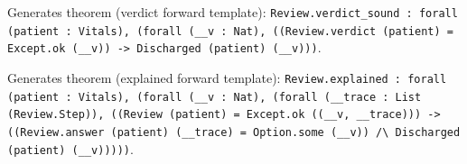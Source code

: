 \documentclass[11pt]{article}
\begin{document}
\noindent Generates theorem (verdict forward template): \texttt{Review.verdict\_sound : forall (patient : Vitals), (forall (\_\_v : Nat), ((Review.verdict (patient) = Except.ok (\_\_v)) -> Discharged (patient) (\_\_v)))}.\par
\noindent Generates theorem (explained forward template): \texttt{Review.explained : forall (patient : Vitals), (forall (\_\_v : Nat), (forall (\_\_trace : List (Review.Step)), ((Review (patient) = Except.ok ((\_\_v, \_\_trace))) -> ((Review.answer (patient) (\_\_trace) = Option.some (\_\_v)) /\textbackslash{} Discharged (patient) (\_\_v)))))}.\par
\end{document}
